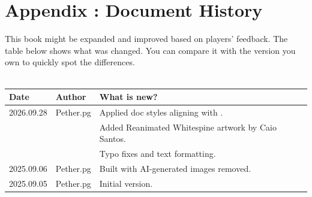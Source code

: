\onecolumn
\chapter{Appendix \thechapter{}: Document History}

This book might be expanded and improved based on players' feedback. The table below shows what was changed. You can compare it with the version you own to quickly spot the differences. \\ \\

\begin{tabular}{p{2cm} p{2cm} p{10cm}}
	Date & Author & What is new? \\ \hline
	
	\color{black} 2026.09.28 
	& \color{black} Pether.pg 
	& \color{black} Applied doc styles aligning with \cosmereRPG{}. \\
	
	&& \color{black} Added Reanimated Whitespine artwork by Caio Santos.\\
	
	&& \color{black} Typo fixes and text formatting. \\
	\hline	
		
	
	\color{black} 2025.09.06 & \color{black} Pether.pg & \color{black} Built with AI-generated images removed. \\ \hline	
	
	\color{black} 2025.09.05 & \color{black} Pether.pg & \color{black} Initial version. \\ \hline
\end{tabular}

\twocolumn

